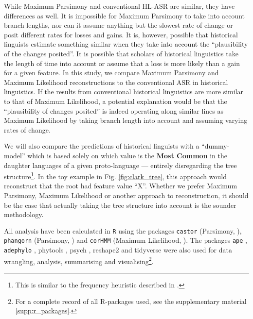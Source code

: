 \documentclass[12pt,letterpaper]{article}
\begin{document}
While Maximum Parsimony and conventional HL-ASR are similar, they have differences as well. It is impossible for Maximum Parsimony to take into account branch lengths, nor can it assume anything but the slowest rate of change or posit different rates for losses and gains. It is, however, possible that historical linguists estimate something similar when they take into account the ``plausibility of the changes posited''. It is possible that scholars of historical linguistics take the length of time into account or assume that a loss is more likely than a gain for a given feature. In this study, we compare Maximum Parsimony and Maximum Likelihood reconstructions to the conventional ASR in historical linguistics. If the results from conventional historical linguistics are more similar to that of Maximum Likelihood, a potential explanation would be that the ``plausibility of changes posited'' is indeed operating along similar lines as Maximum Likelihood by taking branch length into account and assuming varying rates of change.

We will also compare the predictions of historical linguists with a ``dummy-model'' which is based solely on which value is the \textbf{Most Common} in the daughter languages of a given proto-language --- entirely disregarding the tree structure\footnote{This is similar to the frequency heuristic described in \citet{goldstein_2022}.}. In the toy example in Fig. \ref{fig:clark_tree}, this approach would reconstruct that the root had feature value ``X''. Whether we prefer Maximum Parsimony, Maximum Likelihood or another approach to reconstruction, it should be the case that actually taking the tree structure into account is the sounder methodology. %

All analysis have been calculated in \texttt{R} \citep{R} using the packages \texttt{castor} (Parsimony, \citet{louca2017efficient}), \texttt{phangorn} (Parsimony, \citet{phangorn}) and \texttt{corHMM} (Maximum Likelihood, \citet{R-corHMM}). The packages \texttt{ape} \citep{paradis2004ape}, \texttt{adephylo} \citep{jombart2017package}, phytools \citep{revell2012phytools}, psych \citep{psych_r_package},  reshape2 \citep{wickham2020reshape2} and tidyverse \citep{tidyverse13} were also used for data wrangling, analysis, summarising and visualising\footnote{For a complete record of all R-packages used, see the supplementary material \ref{supp:r_packages}.}.
\end{document}
